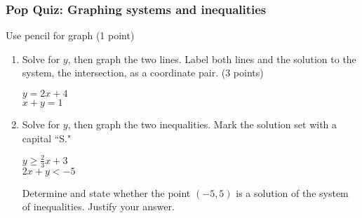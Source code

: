 \documentclass[12pt, twoside]{article}
\begin{document}
\subsubsection*{Pop Quiz: Graphing systems and inequalities}
Use pencil for graph (1 point)
  \begin{enumerate}

  \item Solve for $y$, then graph the two lines. Label both lines and the solution to the system, the intersection, as a coordinate pair. (3 points)

    \begin{multicols}{2}
      $y = 2x + 4$ \\
      $x+y = 1$
    \end{multicols}
    \vspace{3cm}

    \begin{center} %
    \end{center}

  \newpage
    \item Solve for $y$, then graph the two inequalities. Mark the solution set with a capital ``S."

      \begin{multicols}{2}
        $y \geq \frac{2}{3}x+3$ \\
        $2x+y < -5$
      \end{multicols}
      \vspace{3cm}

      \begin{center} %
      \end{center}
      Determine and state whether the point $(-5,5)$ is a solution of the system of inequalities. Justify your answer.



\end{enumerate}
\newpage
\setcounter{page}{1}
\end{document}
